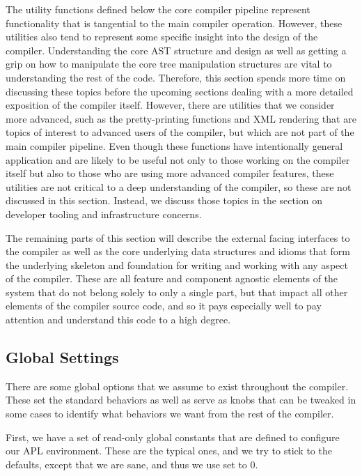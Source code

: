 \documentclass{article}%
\begin{document}
The utility functions defined below the core compiler pipeline
represent functionality that is tangential to the main compiler
operation.
However, these utilities also tend to represent some specific 
insight into the design of the compiler.
Understanding the core AST structure and design as well as 
getting a grip on how to manipulate the core tree manipulation
structures are vital to understanding the rest of the code.
Therefore, this section spends more time on discussing these
topics before the upcoming sections dealing with a more detailed 
exposition of the compiler itself.
However, there are utilities that we consider more advanced, 
such as the pretty-printing functions and XML rendering
that are topics of interest to advanced users of the compiler,
but which are not part of the main compiler pipeline.
Even though these functions have intentionally general 
application and are likely to be useful not only to those 
working on the compiler itself but also to those who are using 
more advanced compiler features, 
these utilities are not critical to a deep understanding 
of the compiler, 
so these are not discussed in this section. 
Instead, we discuss those topics in the section on developer 
tooling and infrastructure concerns.

The remaining parts of this section will describe the external
facing interfaces to the compiler as well as the core underlying 
data structures and idioms that form the underlying skeleton and 
foundation for writing and working with any aspect of the compiler.
These are all feature and component agnostic elements of the system
that do not belong solely to only a single part, 
but that impact all other elements of the compiler source code,
and so it pays especially well to pay attention and understand
this code to a high degree.

\nwenddocs{}\subsection{Global Settings}

There are some global options that we assume to exist throughout
the compiler.
These set the standard behaviors as well as serve as knobs that 
can be tweaked in some cases to identify what behaviors we want 
from the rest of the compiler.

First, we have a set of read-only global constants that are defined
to configure our APL environment.
These are the typical ones, and we try to stick to the defaults,
except that we are sane, and thus we use {\Tt{}\nwendquote} set to {\Tt{}0\nwendquote}.
\end{document}
